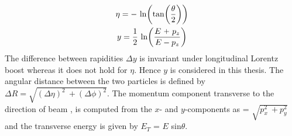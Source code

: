\begin{equation}
\begin{gathered}
\eta = -~{\rm ln}\bigg({\rm tan}\bigg(\frac{\theta}{2}\bigg)\bigg)\\
y = \frac{1}{2}~{\rm ln} \bigg(\frac{E~\plus p_z}{E - p_z} \bigg)
\end{gathered}
\label{eq:pseudorap}
\end{equation}
The difference between rapidities $\Delta y$ is invariant under longitudinal Lorentz boost whereas it does not hold for $\eta$. Hence $y$ is considered in this thesis. The angular distance between the two particles is defined by $\Delta R = \sqrt{(\Delta \eta)^2~\plus (\Delta \phi)^2}$. The momentum component transverse to the direction of beam \pt, is computed from the $x$- and $y$-components as \pt = $\sqrt{p^2_x~\plus p^2_y}$ and the transverse energy is given by $E_T$ = $E$ sin$\theta$.
 
